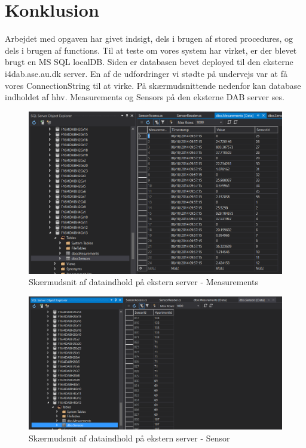 \section{Konklusion}
Arbejdet med opgaven har givet indsigt, dels i brugen af stored procedures, og dels i brugen af functions.
Til at teste om vores system har virket, er der blevet brugt en MS SQL localDB. Siden er databasen bevet deployed til den eksterne i4dab.ase.au.dk server. En af de udfordringer vi stødte på undervejs var at få vores ConnectionString til at virke. På skærmudsnittende nedenfor kan database indholdet af hhv. Measurements og Sensors på den eksterne DAB server ses.


\begin{figure}
\centering
\includegraphics[width=\linewidth]{figs/measurement_remote}
\caption{Skærmudsnit af dataindhold på ekstern server - Measurements}
\label{fig:measurement_remote}
\end{figure}

\begin{figure}
	\centering
	\includegraphics[width=\linewidth]{figs/sensor_remote}
	\caption{Skærmudsnit af dataindhold på ekstern server - Sensor}
	\label{fig:sensor_remote}
\end{figure}